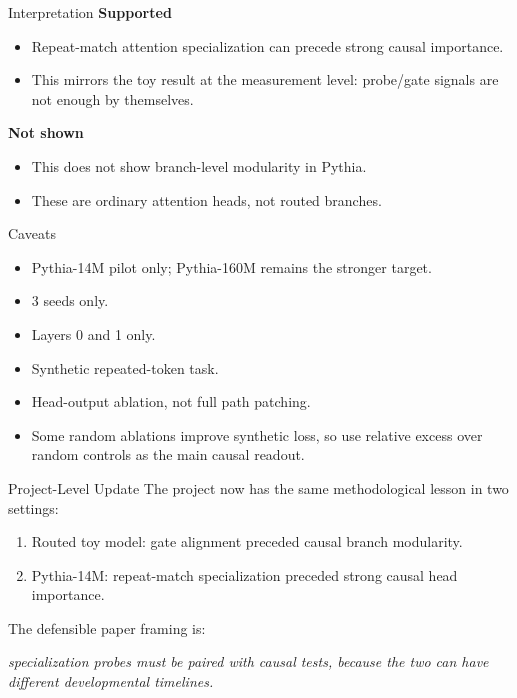 \documentclass[aspectratio=169]{beamer}
\begin{document}
\begin{frame}{Interpretation}
  \textbf{Supported}
  \begin{itemize}
    \item Repeat-match attention specialization can precede strong causal
    importance.
    \item This mirrors the toy result at the measurement level: probe/gate
    signals are not enough by themselves.
  \end{itemize}

  \vspace{0.7em}
  \textbf{Not shown}
  \begin{itemize}
    \item This does not show branch-level modularity in Pythia.
    \item These are ordinary attention heads, not routed branches.
  \end{itemize}
\end{frame}

\begin{frame}{Caveats}
  \begin{itemize}
    \item Pythia-14M pilot only; Pythia-160M remains the stronger target.
    \item 3 seeds only.
    \item Layers 0 and 1 only.
    \item Synthetic repeated-token task.
    \item Head-output ablation, not full path patching.
    \item Some random ablations improve synthetic loss, so use relative excess
    over random controls as the main causal readout.
  \end{itemize}
\end{frame}

\begin{frame}{Project-Level Update}
  The project now has the same methodological lesson in two settings:

  \begin{enumerate}
    \item Routed toy model: gate alignment preceded causal branch modularity.
    \item Pythia-14M: repeat-match specialization preceded strong causal head
    importance.
  \end{enumerate}

  \vspace{0.8em}
  The defensible paper framing is:

  \vspace{0.5em}
  \begin{center}
  \textit{specialization probes must be paired with causal tests, because the
  two can have different developmental timelines.}
  \end{center}
\end{frame}
\end{document}
